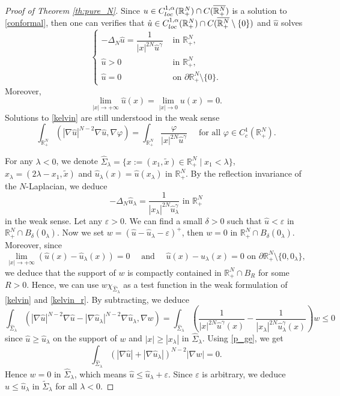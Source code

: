 \documentclass[reqno]{amsart}
\theoremstyle{plain}
\theoremstyle{definition}
\theoremstyle{remark}
\begin{document}
	\begin{proof}[Proof of Theorem \ref{th:pure_N}]
		Since $u \in C^{1,\alpha}_{\rm loc}(\mathbb{R}^N_+) \cap C(\overline{\mathbb{R}^N_+})$ is a solution to \eqref{conformal}, then one can verifies that $\hat u \in C^{1,\alpha}_{\rm loc}(\mathbb{R}^N_+) \cap C(\overline{\mathbb{R}^N_+}\setminus\{0\})$ and $\hat u$ solves
		\begin{equation}\label{kelvin}
			\begin{cases}
				-\Delta_N \hat u = \dfrac{1}{|x|^{2N}\hat u^\gamma} & \text{ in } \mathbb{R}^N_+,\\
				\hat u>0 & \text{ in } \mathbb{R}^N_+,\\
				\hat u=0 & \text{ on } \partial\mathbb{R}^N_+\setminus\{0\}.
			\end{cases}
		\end{equation}
		Moreover,
		\[
		\lim_{|x|\to+\infty} \hat u(x) = \lim_{|x|\to0} u(x) = 0.
		\]
		Solutions to \eqref{kelvin} are still understood in the weak sense
		\[
		\int_{\mathbb{R}^N_+} (|\nabla \hat u|^{N-2} \nabla \hat u, \nabla \varphi) = \int_{\mathbb{R}^N_+} \frac{\varphi}{|x|^{2N}\hat u^\gamma} \quad\text{ for all } \varphi\in C^1_c(\mathbb{R}^N_+).
		\]
		
		For any $\lambda<0$, we denote $\hat\Sigma_\lambda=\{x:=(x_1,\tilde x)\in\mathbb{R}^N_+ \mid x_1<\lambda\}$, $x_\lambda=(2\lambda-x_1, \tilde x)$ and $\hat u_\lambda(x) = \hat u(x_\lambda)$ in $\mathbb{R}^N_+$. By the reflection invariance of the $N$-Laplacian, we deduce
		\begin{equation}\label{kelvin_r}
			-\Delta_N \hat u_\lambda = \frac{1}{|x_\lambda|^{2N}\hat u_\lambda^\gamma} \text{ in } \mathbb{R}^N_+
		\end{equation}
		in the weak sense. Let any $\varepsilon>0$. We can find a small $\delta>0$ such that $\hat u<\varepsilon$ in $\mathbb{R}^N_+\cap B_\delta(0_\lambda)$. Now we set $w=(\hat u-\hat u_\lambda-\varepsilon)^+$, then $w=0$ in $\mathbb{R}^N_+\cap B_\delta(0_\lambda)$. Moreover, since
		\[
		\lim_{|x|\to+\infty} (\hat u(x)-\hat u_\lambda(x)) = 0 \quad\text{ and }\quad \hat u(x)-\hat u_\lambda(x)=0 \text{ on } \partial\mathbb{R}^N_+\setminus\{0, 0_\lambda\},
		\]
		we deduce that the support of $w$ is compactly contained in $\mathbb{R}^N_+\cap B_R$ for some $R>0$. Hence, we can use $w\chi_{\hat\Sigma_\lambda}$ as a test function in the weak formulation of \eqref{kelvin} and \eqref{kelvin_r}. By subtracting, we deduce
		\[
		\int_{\hat\Sigma_\lambda} (|\nabla \hat u|^{N-2}\nabla \hat u - |\nabla \hat u_\lambda|^{N-2}\nabla \hat u_\lambda, \nabla w) = \int_{\hat\Sigma_\lambda} \left(\dfrac{1}{|x|^{2N}\hat u^\gamma(x)} - \frac{1}{|x_\lambda|^{2N}\hat u_\lambda^\gamma(x)}\right) w \le 0
		\]
		since $\hat u \ge \hat u_\lambda$ on the support of $w$ and $|x|\ge|x_\lambda|$ in $\hat\Sigma_\lambda$. Using \eqref{p_ge}, we get
		\[
		\int_{\hat\Sigma_\lambda} (|\nabla \hat u| + |\nabla \hat u_\lambda|)^{N-2} |\nabla w| = 0.
		\]
		Hence $w=0$ in $\hat\Sigma_\lambda$, which means $\hat u\le \hat u_\lambda+\varepsilon$. Since $\varepsilon$ is arbitrary, we deduce $\hat u\le \hat u_\lambda$ in $\tilde\Sigma_\lambda$ for all $\lambda<0$.
		

\end{proof}
\end{document}
